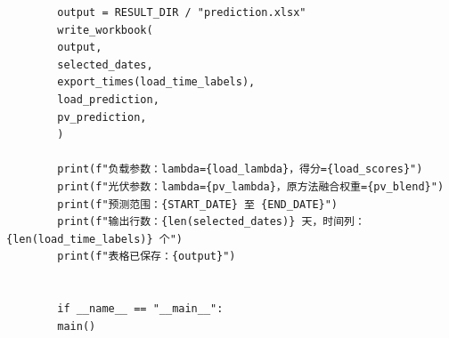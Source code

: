 \documentclass[UTF8]{ctexart}
\begin{document}
\begin{verbatim}
        output = RESULT_DIR / "prediction.xlsx"
        write_workbook(
        output,
        selected_dates,
        export_times(load_time_labels),
        load_prediction,
        pv_prediction,
        )
        
        print(f"负载参数：lambda={load_lambda}，得分={load_scores}")
        print(f"光伏参数：lambda={pv_lambda}，原方法融合权重={pv_blend}")
        print(f"预测范围：{START_DATE} 至 {END_DATE}")
        print(f"输出行数：{len(selected_dates)} 天，时间列：{len(load_time_labels)} 个")
        print(f"表格已保存：{output}")
        
        
        if __name__ == "__main__":
        main()
        
    \end{verbatim}
    
    
    
\end{document}
